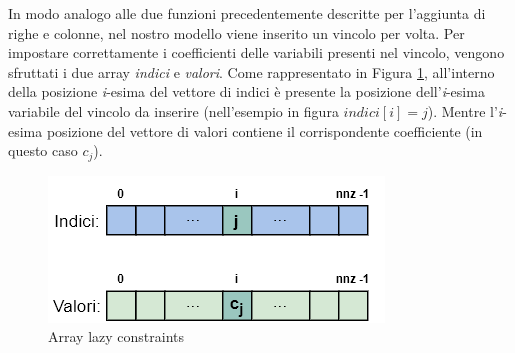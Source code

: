 In modo analogo alle due funzioni precedentemente descritte per l'aggiunta di righe e colonne, nel nostro modello viene inserito un vincolo per volta. Per impostare correttamente i coefficienti delle variabili presenti nel vincolo, vengono sfruttati i due array \textit{indici} e \textit{valori}. Come rappresentato in Figura \ref{lazy_constraints}, all'interno della posizione \textit{i}-esima del vettore di indici è presente la posizione dell'\textit{i}-esima variabile del vincolo da inserire (nell'esempio in figura $indici[i]=j$). Mentre l'\textit{i}-esima posizione del vettore di valori contiene il corrispondente  coefficiente (in questo caso $c_j$).
\begin{figure}[h] 
\begin{center} 
  \includegraphics[scale=0.5]{Images/lazy_constraints} 
  \caption{\footnotesize{Array lazy constraints}}
  \label{lazy_constraints} 
\end{center} 
\end{figure}

